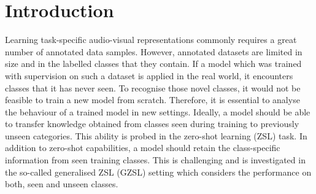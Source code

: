 \documentclass[runningheads]{llncs}
\begin{document}
\section{Introduction}
Learning task-specific audio-visual representations commonly requires a great number of annotated data samples.
However, annotated datasets are limited in size and in the labelled classes that they contain. If a model which was trained with supervision on such a dataset is applied in the real world, it encounters classes that it has never seen. To recognise those novel classes, it would not be feasible to train a new model from scratch. Therefore, it is essential to analyse the behaviour of a trained model in new settings. Ideally, a model should be able to transfer knowledge obtained from classes seen during training to previously unseen categories. This ability is probed in the zero-shot learning (ZSL) task. In addition to zero-shot capabilities, a model should retain the class-specific information from seen training classes. This is challenging and is investigated in the so-called generalised ZSL (GZSL) setting which considers the performance on both, seen and unseen classes. 
\end{document}
